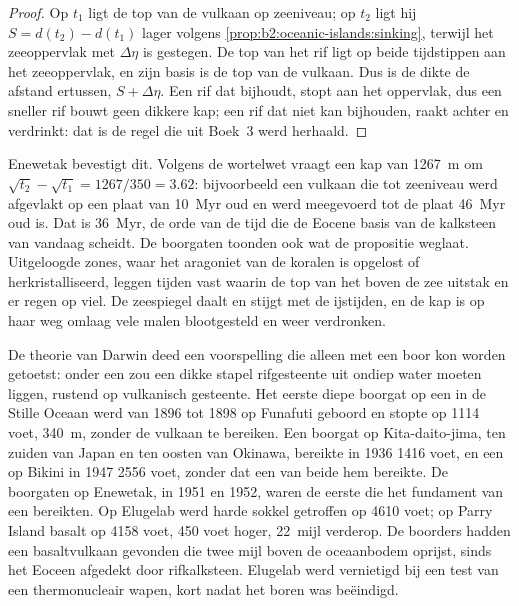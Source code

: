\begin{proof}
Op $t_1$ ligt de top van de vulkaan op zeeniveau; op $t_2$ ligt hij $S = d(t_2) - d(t_1)$ lager volgens
\cref{prop:b2:oceanic-islands:sinking}, terwijl het zeeoppervlak met $\Delta\eta$ is gestegen. De top
van het rif ligt op beide tijdstippen aan het zeeoppervlak, en zijn basis is de top van de vulkaan. Dus is de
dikte de afstand ertussen, $S + \Delta\eta$. Een rif dat bijhoudt, stopt aan het
oppervlak, dus een sneller rif bouwt geen dikkere kap; een rif dat niet kan bijhouden, raakt achter
en verdrinkt: dat is de regel die uit Boek~3 werd herhaald.
\end{proof}

Enewetak bevestigt dit. Volgens de wortelwet vraagt een kap van \qty{1267}{m} om $\sqrt{t_2} - \sqrt{t_1} =
1267/350 = 3.62$: bijvoorbeeld een vulkaan die tot zeeniveau werd afgevlakt op een plaat van \qty{10}{Myr} oud en
werd meegevoerd tot de plaat \qty{46}{Myr} oud is. Dat is \qty{36}{Myr}, de orde van de tijd die
de Eocene basis van de kalksteen van vandaag scheidt. De boorgaten toonden ook wat de
propositie weglaat. Uitgeloogde zones, waar het aragoniet van de koralen is opgelost of
herkristalliseerd, leggen tijden vast waarin de top van het  boven de zee uitstak en er regen op viel.
De zeespiegel daalt en stijgt met de ijstijden, en de kap is op haar weg omlaag vele malen
blootgesteld en weer verdronken.

\begin{history}
De theorie van Darwin deed een voorspelling die alleen met een boor kon worden getoetst: onder een  zou
een dikke stapel rifgesteente uit ondiep water moeten liggen, rustend op vulkanisch gesteente. Het eerste diepe boorgat
op een  in de Stille Oceaan werd van 1896 tot 1898 op Funafuti geboord en stopte op 1114 voet,
\qty{340}{m}, zonder de vulkaan te bereiken. Een boorgat op Kita-daito-jima, ten zuiden van Japan en ten oosten van Okinawa,
bereikte in 1936 1416 voet, en een op Bikini in 1947 2556 voet, zonder dat een van beide hem bereikte. De boorgaten op Enewetak, in
1951 en 1952, waren de eerste die het fundament van een  bereikten. Op Elugelab werd harde sokkel
getroffen op 4610 voet; op Parry Island basalt op 4158 voet, 450 voet hoger, \num{22}~mijl
verderop. De boorders hadden een basaltvulkaan gevonden die twee mijl boven de oceaanbodem oprijst, sinds het Eoceen
afgedekt door rifkalksteen. Elugelab werd vernietigd bij een test van een thermonucleair wapen,
kort nadat het boren was beëindigd.
\end{history}

